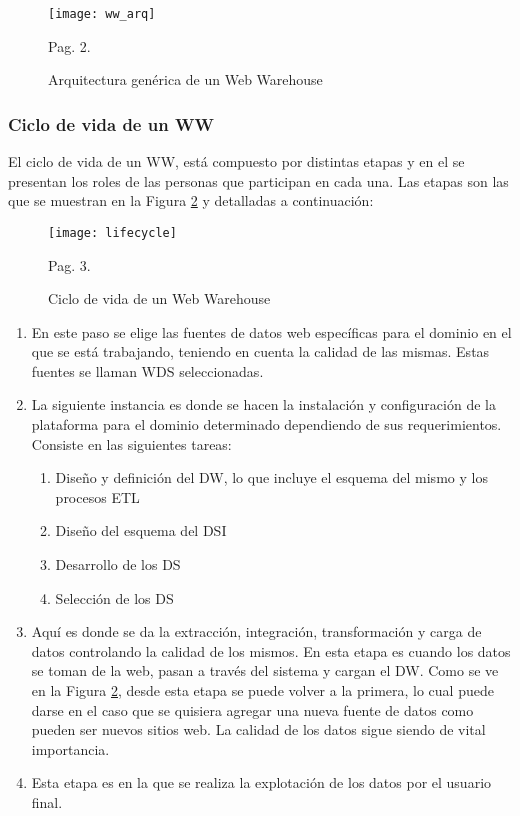 \documentclass[a4paper,11pt]{article}
\begin{document}
    \begin{figure}[!htb]
      \begin{center}
        \texttt{[image: ww\_arq]}
        \caption{Arquitectura genérica de un Web Warehouse} \cite{webwarehouse} Pag. 2.
        \label{ww_arq}
      \end{center}
    \end{figure}
    
    
    \subsubsection{Ciclo de vida de un WW}
    
    El ciclo de vida de un WW, está compuesto por distintas etapas y en el se presentan los roles de las personas que participan en cada una. Las
    etapas son las que se muestran en la Figura \ref{lifecycle} y detalladas a continuación:
    
    \begin{figure}[!htb]
      \begin{center}
        \texttt{[image: lifecycle]}
        \caption{Ciclo de vida de un Web Warehouse} \cite{webwarehouse} Pag. 3.
        \label{lifecycle}
      \end{center}
    \end{figure}
    
    \begin{enumerate}
      \item En este paso se elige las fuentes de datos web específicas para el dominio en el que se está trabajando, teniendo en cuenta la calidad de las mismas.
      Estas fuentes se llaman WDS seleccionadas.
      \item La siguiente instancia es donde se hacen la instalación y configuración de la plataforma para el dominio determinado dependiendo de sus
      requerimientos. Consiste en las siguientes tareas:
        \begin{enumerate}
          \item Diseño y definición del DW, lo que incluye el esquema del mismo y los procesos ETL
          \item Diseño del esquema del DSI
          \item Desarrollo de los DS
          \item Selección de los DS
        \end{enumerate}
      \item Aquí es donde se da la extracción, integración, transformación y carga de datos controlando la calidad de los mismos. En esta etapa es cuando los
      datos se toman de la web, pasan a través del sistema y cargan el DW. Como se ve en la Figura \ref{lifecycle}, desde esta etapa se puede volver a la
      primera, lo cual puede darse en el caso que se quisiera agregar una nueva fuente de datos como pueden ser nuevos sitios web. La calidad de los datos sigue
      siendo de vital importancia.
      \item Esta etapa es en la que se realiza la explotación de los datos por el usuario final.
    \end{enumerate}
    
\end{document}
